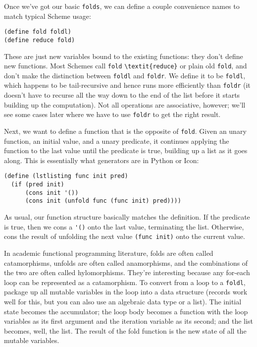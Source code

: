 Once we've got our basic \verb|folds|, we can define a couple convenience names to match typical Scheme usage:
 
\begin{lstlisting}
(define fold foldl)
(define reduce fold)
\end{lstlisting}
 
These are just new variables bound to the existing functions: they don't define new functions. Most Schemes call \verb|fold| \verb|\textit{reduce}| or plain old \verb|fold|, and don't make the distinction between \verb|foldl| and \verb|foldr|. We define it to be \verb|foldl|, which happens to be tail-recursive and hence runs more efficiently than \verb|foldr| (it doesn't have to recurse all the way down to the end of the list before it starts building up the computation). Not all operations are associative, however; we'll see some cases later where we have to use \verb|foldr| to get the right result.
 
Next, we want to define a function that is the opposite of \verb|fold|. Given an unary function, an initial value, and a unary predicate, it continues applying the function to the last value until the predicate is true, building up a list as it goes along. This is essentially what generators are in Python or Icon:
 
\begin{lstlisting}
(define (lstlisting func init pred)
  (if (pred init)
      (cons init '())
      (cons init (unfold func (func init) pred))))
\end{lstlisting}
 
As usual, our function structure basically matches the definition. If the predicate is true, then we cons a \lstinline|'()| onto the last value, terminating the list. Otherwise, cons the result of unfolding the next value \lstinline|(func init)| onto the current value.
 
In academic functional programming literature, folds are often called catamorphisms, unfolds are often called anamorphisms, and the combinations of the two are often called hylomorphisms. They're interesting because any for-each loop can be represented as a catamorphism. To convert from a loop to a \verb|foldl|, package up all mutable variables in the loop into a data structure (records work well for this, but you can also use an algebraic data type or a list). The initial state becomes the accumulator; the loop body becomes a function with the loop variables as its first argument and the iteration variable as its second; and the list becomes, well, the list. The result of the fold function is the new state of all the mutable variables.
 
